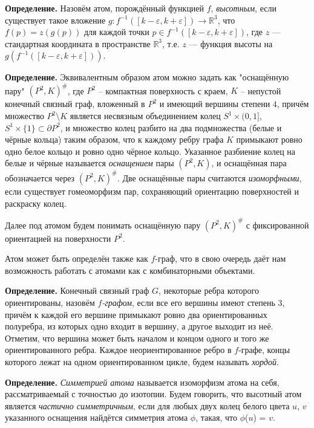 \textbf{Определение. }
	Назовём атом, порождённый функцией $f$, {\em высотным}, если существует такое вложение $g
	\colon f^{-1}([k-\varepsilon, k+\varepsilon ]) \to \mathbb{R}^3$, что $f(p) = z(g(p))$ для каждой точки $p \in f^{-1}([k-\varepsilon, k+\varepsilon ])$, где $z$
	--- стандартная координата в пространстве $\mathbb R^3$, т.е. $z$ --- функция высоты на $g(f^{-1}([k-\varepsilon, k+\varepsilon ]))$.
	
			


\textbf{Определение.} Эквивалентным образом атом можно задать как "оснащённую пару"  $(P^2, K)^\#$, где $P^2$ -- компактная 	 поверхность с краем, $K$ -- непустой конечный связный граф, вложенный в $P^2$ и имеющий вершины		степени  $4$, причём множество $P^2 \setminus K$ является несвязным		объединением колец $S^1 \times (0, 1]$, $ S^1 \times \{1\} \subset\partial P^2$, и  множество колец разбито на два подмножества (белые и чёрные кольца) таким образом, что 	к каждому ребру графа $K$ примыкают ровно одно белое кольцо и ровно одно чёрное кольцо. 	Указанное разбиение колец  на белые и чёрные называется {\em 	оснащением} пары $(P^2, K)$, и оснащённая пара обозначается через $(P^2, K)^\#$.	Две  оснащённые пары считаются {\em изоморфными}, если существует	 гомеоморфизм  пар, сохраняющий ориентацию поверхностей  и раскраску колец.


Далее под атомом будем понимать оснащённую пару $(P^2, K)^\#$ с фиксированной ориентацией на поверхности $P^2$.



Атом может быть определён также как $f$-граф, что в свою очередь даёт нам возможность работать с атомами как с комбинаторными объектами.



\textbf{Определение.} %
Конечный связный граф $G$, некоторые ребра которого ориентированы, назовём {\em
 $f$-графом}, если все его вершины имеют степень $3$, причём к каждой его
вершине примыкают ровно два ориентированных полуребра, из которых одно входит в вершину,
а другое выходит из неё. Отметим, что вершина может быть началом и концом одного и того
же ориентированного ребра. Каждое неориентированное ребро в $f$-графе, концы которого лежат на одном ориентированном цикле,  будем называть { \em хордой}.



{\bf Определение.}
	{\em Симметрией атома}  называется изоморфизм  атома на себя, рассматриваемый с точностью до изотопии. Будем говорить, что  высотный атом   является {\em частично симметричным}, если для любых двух колец белого  цвета $u$, $v$ указанного оснащения найдётся симметрия атома $\phi $, такая, что  $\phi$($u$) = $v$.
	
